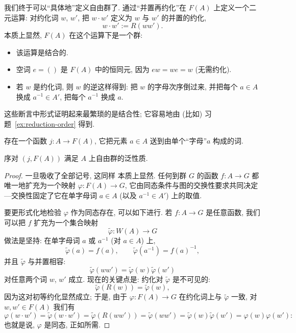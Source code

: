 我们终于可以``具体地''定义自由群了. 通过``并置再约化''在 $F(A)$ 上定义一个二元运算: 对约化词 $w$, $w'$, 把 $w \cdot w'$ 定义为 $w$ 与 $w'$ 的并置的约化,
\[
w \cdot w' := R(ww').
\]
 本质上显然, $F(A)$ 在这个运算下是一个群:
\begin{itemize}
	\item 该运算是结合的.
	\item 空词 $e = ()$ 是 $F(A)$ 中的恒同元, 因为 $ew = we = w$ (无需约化).
	\item 若 $w$ 是约化词, 则 $w$ 的逆这样得到: 把 $w$ 的字母次序倒过来, 并把每个 $a \in A$ 换成 $a^{-1} \in A'$, 把每个 $a^{-1}$ 换成 $a$.
\end{itemize}
这些断言中形式证明起来最繁琐的是结合性; 它容易地由 (比如) 习题~\ref{ex:reduction-order} 得到.

存在一个函数 $j : A \to F(A)$, 它把元素 $a \in A$ 送到由单个``字母''$a$ 构成的词.

\begin{proposition}
\label{prop:free-group-construction}
序对 $(j, F(A))$ 满足 $A$ 上自由群的泛性质.
\end{proposition}

\begin{proof}
一旦吸收了全部记号, 这同样 本质上显然. 任何到群 $G$ 的函数 $f : A \to G$ 都唯一地扩充为一个映射 $\varphi : F(A) \to G$, 它由同态条件与图的交换性要求共同决定---交换性固定了它在单字母词 $a \in A$ (以及 $a^{-1} \in A'$) 上的取值.

要更形式化地检验 $\varphi$ 作为同态存在, 可以如下进行. 若 $f : A \to G$ 是任意函数, 我们可以把 $f$ 扩充为一个集合映射
\[
\tilde{\varphi} : W(A) \to G
\]
做法是坚持: 在单字母词 $a$ 或 $a^{-1}$ (对 $a \in A$) 上,
\[
\tilde{\varphi}(a) = f(a), \qquad \tilde{\varphi}(a^{-1}) = f(a)^{-1},
\]
并且 $\tilde{\varphi}$ 与并置相容:
\[
\tilde{\varphi}(ww') = \tilde{\varphi}(w)\tilde{\varphi}(w')
\]
对任意两个词 $w$, $w'$ 成立. 现在的关键点是: 约化对 $\tilde{\varphi}$ 是不可见的:
\[
\tilde{\varphi}(R(w)) = \tilde{\varphi}(w),
\]
因为这对初等约化显然成立; 于是, 由于 $\varphi : F(A) \to G$ 在约化词上与 $\tilde{\varphi}$ 一致, 对 $w, w' \in F(A)$ 我们有
\[
\varphi(w \cdot w') = \tilde{\varphi}(w \cdot w') = \tilde{\varphi}(R(ww')) = \tilde{\varphi}(ww') = \tilde{\varphi}(w)\tilde{\varphi}(w') = \varphi(w)\varphi(w'):
\]
也就是说, $\varphi$ 是同态, 正如所需.
\end{proof}

